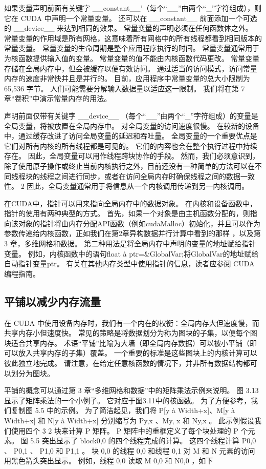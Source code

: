 如果变量声明前面有关键字 \_\_constant\_\_'（每个“\_\_”由两个“\_”字符组成），则它在 CUDA 中声明一个常量变量。 还可以在 \_\_constant\_\_ 前面添加一个可选的 \_\_device\_\_ 来达到相同的效果。 常量变量的声明必须在任何函数体之外。 常量变量的作用域是所有网格，这意味着所有网格中的所有线程都看到相同版本的常量变量。 常量变量的生命周期是整个应用程序执行的时间。 常量变量通常用于为核函数提供输入值的变量。 常量变量的值不能由内核函数代码更改。 常量变量存储在全局内存中，但会被缓存以便有效访问。 通过适当的访问模式，访问常量内存的速度非常快并且是并行的。 目前，应用程序中常量变量的总大小限制为 65,536 字节。 人们可能需要分解输入数据量以适应这一限制。 我们将在第 7 章“卷积”中演示常量内存的用法。

声明前面仅带有关键字 \_\_device\_\_ （每个“\_\_”由两个“\_”字符组成）的变量是全局变量，将被放置在全局内存中。 对全局变量的访问速度很慢。 在较新的设备中，通过缓存改进了访问全局变量的延迟和吞吐量。 全局变量的一个重要优点是它们对所有内核的所有线程都是可见的。 它们的内容也会在整个执行过程中持续存在。 因此，全局变量可以用作线程跨块协作的手段。 然而，我们必须意识到，除了使用原子操作或终止当前内核执行之外，目前还没有一种简单的方法可以在不同线程块的线程之间进行同步，或者在访问全局内存时确保线程之间的数据一致性。 2 因此，全局变量通常用于将信息从一个内核调用传递到另一内核调用。

在CUDA中，指针可以用来指向全局内存中的数据对象。 在内核和设备函数中，指针的使用有两种典型的方式。 首先，如果一个对象是由主机函数分配的，则指向该对象的指针将由内存分配API函数（例如cudaMalloc）初始化，并且可以作为参数传递给内核函数，正如我们在第2章异构数据并行计算中看到的那样 ，以及第 3 章，多维网格和数据。 第二种用法是将全局内存中声明的变量的地址赋给指针变量。 例如，内核函数中的语句{float à ptr=\&GlobalVar;}将GlobalVar的地址赋给自动指针变量ptr。 有关在其他内存类型中使用指针的信息，读者应参阅 CUDA 编程指南。

\subsection{平铺以减少内存流量}
在 CUDA 中使用设备内存时，我们有一个内在的权衡：全局内存大但速度慢，而共享内存小但速度快。 常见的策略是将数据划分为称为图块的子集，以便每个图块适合共享内存。 术语“平铺”比喻为大墙（即全局内存数据）可以被小平铺（即可以放入共享内存的子集）覆盖。 一个重要的标准是这些图块上的内核计算可以彼此独立地完成。 请注意，在给定任意核函数的情况下，并非所有数据结构都可以划分为图块。

平铺的概念可以通过第 3 章“多维网格和数据”中的矩阵乘法示例来说明。 图 3.13 显示了矩阵乘法的一个小例子。 它对应于图3.11中的核函数。 为了方便参考，我们复制图 5.5 中的示例。 为了简洁起见，我们将 P[y à Width+x]、M[y à Width+x] 和 N[y à Width+x] 分别缩写为 Py,x 、My, x 和 Ny,x 。 此示例假设我们使用四个 3 2 块来计算 P 矩阵。 P 矩阵中的重框定义了每个块处理的 P 个元素。 图 5.5 突出显示了 block0,0 的四个线程完成的计算。 这四个线程计算 P0,0 、 P0,1 、 P1,0 和 P1,1 。 块 0,0 的线程 0,0 和线程 0,1 对 M 和 N 元素的访问用黑色箭头突出显示。 例如，线程 0,0 读取 M 0,0 和 N0,0 ，如下

